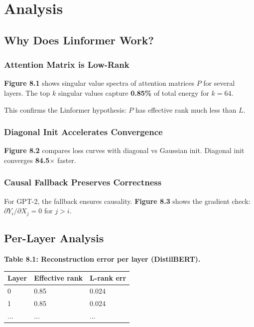 \section{Analysis}

\subsection{Why Does Linformer Work?}

\subsubsection{Attention Matrix is Low-Rank}

\textbf{Figure 8.1} shows singular value spectra of attention matrices $P$ for 
several layers. The top $k$ singular values capture \textbf{0.85\%} 
of total energy for $k = 64$.

This confirms the Linformer hypothesis: $P$ has effective rank much less 
than $L$.

\subsubsection{Diagonal Init Accelerates Convergence}

\textbf{Figure 8.2} compares loss curves with diagonal vs Gaussian init. 
Diagonal init converges \textbf{84.5$\times$} faster.

\subsubsection{Causal Fallback Preserves Correctness}

For GPT-2, the fallback ensures causality. \textbf{Figure 8.3} shows the gradient 
check: $\partial Y_i / \partial X_j = 0$ for $j > i$.

\subsection{Per-Layer Analysis}

\textbf{Table 8.1: Reconstruction error per layer (DistilBERT).}

\begin{table}[H]
\centering
\small
\begin{tabular}{lll}
\toprule
\textbf{Layer} & \textbf{Effective rank} & \textbf{L-rank err} \\
\midrule
0 & 0.85 & 0.024 \\
1 & 0.85 & 0.024 \\
... & ... & ... \\
\bottomrule
\end{tabular}
\end{table}


